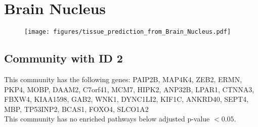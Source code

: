 
\section*{Brain Nucleus}
\begin{figure}[h!]
\centering
\texttt{[image: figures/tissue\_prediction\_from\_Brain\_Nucleus.pdf]}
\end{figure}



\subsection*{Community with ID 2}
This community has the following genes: PAIP2B, MAP4K4, ZEB2, ERMN, PKP4, MOBP, DAAM2, C7orf41, MCM7, HIPK2, ANP32B, LPAR1, CTNNA3, FBXW4, KIAA1598, GAB2, WNK1, DYNC1LI2, KIF1C, ANKRD40, SEPT4, MBP, TP53INP2, BCAS1, FOXO4, SLCO1A2
\\
This community has no enriched pathways below adjusted p-value $< 0.05$.

